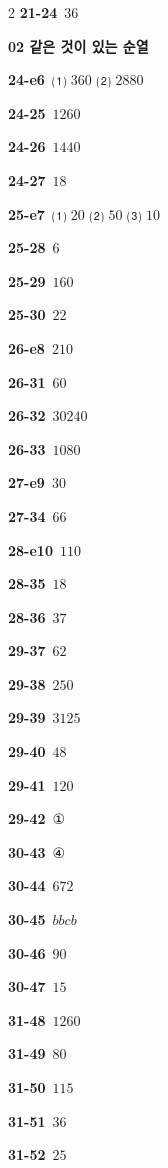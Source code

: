 \documentclass[10pt,a4paper]{article}
\begin{document}
\begin{multicols}{2}
\noindent\textbf{21-24}\ $36$\par
\noindent\textbf{02 같은 것이 있는 순열}\par\smallskip
\noindent\textbf{24-e6}\ ⑴ $360$ ⑵ $2880$\par
\noindent\textbf{24-25}\ $1260$\par
\noindent\textbf{24-26}\ $1440$\par
\noindent\textbf{24-27}\ $18$\par
\noindent\textbf{25-e7}\ ⑴ $20$ ⑵ $50$ ⑶ $10$\par
\noindent\textbf{25-28}\ $6$\par
\noindent\textbf{25-29}\ $160$\par
\noindent\textbf{25-30}\ $22$\par
\noindent\textbf{26-e8}\ $210$\par
\noindent\textbf{26-31}\ $60$\par
\noindent\textbf{26-32}\ $30240$\par
\noindent\textbf{26-33}\ $1080$\par
\noindent\textbf{27-e9}\ $30$\par
\noindent\textbf{27-34}\ $66$\par
\noindent\textbf{28-e10}\ $110$\par
\noindent\textbf{28-35}\ $18$\par
\noindent\textbf{28-36}\ $37$\par
\noindent\textbf{29-37}\ $62$\par
\noindent\textbf{29-38}\ $250$\par
\noindent\textbf{29-39}\ $3125$\par
\noindent\textbf{29-40}\ $48$\par
\noindent\textbf{29-41}\ $120$\par
\noindent\textbf{29-42}\ ①\par
\noindent\textbf{30-43}\ ④\par
\noindent\textbf{30-44}\ $672$\par
\noindent\textbf{30-45}\ $bbcb$\par
\noindent\textbf{30-46}\ $90$\par
\noindent\textbf{30-47}\ $15$\par
\noindent\textbf{31-48}\ $1260$\par
\noindent\textbf{31-49}\ $80$\par
\noindent\textbf{31-50}\ $115$\par
\noindent\textbf{31-51}\ $36$\par
\noindent\textbf{31-52}\ $25$\par

\end{multicols}
\end{document}
